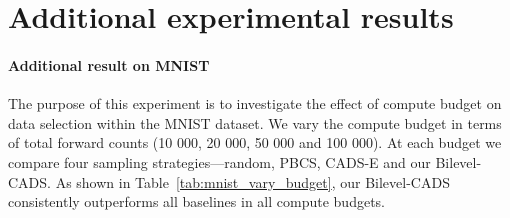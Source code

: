 \section{Additional experimental results}
\label{appendix:additional-results}
\paragraph{Additional result on MNIST}
The purpose of this experiment is to investigate the effect of compute budget on data selection within the MNIST dataset. We vary the compute budget in terms of total forward counts (10 000, 20 000, 50 000 and 100 000). At each budget we compare four sampling strategies—random, PBCS, CADS-E and our Bilevel-CADS.
As shown in Table~\ref{tab:mnist_vary_budget}, our Bilevel-CADS consistently outperforms all baselines in all compute budgets.
\begin{table}[!htbp]
  \centering
  \caption{Results on MNIST with various compute budgets.}
  \label{tab:mnist_vary_budget}
\end{table} 